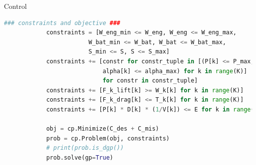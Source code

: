 \begin{chapter}{Control}
\begin{algorithm}[H]
\begin{lstlisting}[language=Python]
            ### constraints and objective ###
            constraints = [W_eng_min <= W_eng, W_eng <= W_eng_max,
                        W_bat_min <= W_bat, W_bat <= W_bat_max,
                        S_min <= S, S <= S_max]
            constraints += [constr for constr_tuple in [(P[k] <= P_max,
                            alpha[k] <= alpha_max) for k in range(K)]
                            for constr in constr_tuple]
            constraints += [F_k_lift[k] >= W_k[k] for k in range(K)]
            constraints += [F_k_drag[k] <= T_k[k] for k in range(K)]
            constraints += [P[k] * D[k] * (1/V[k]) <= E for k in range(K)]
            
            obj = cp.Minimize(C_des + C_mis)
            prob = cp.Problem(obj, constraints)
            # print(prob.is_dgp())
            prob.solve(gp=True)
            \end{lstlisting}
        \label{alg:uav_code}
    \end{algorithm}







\end{chapter}

